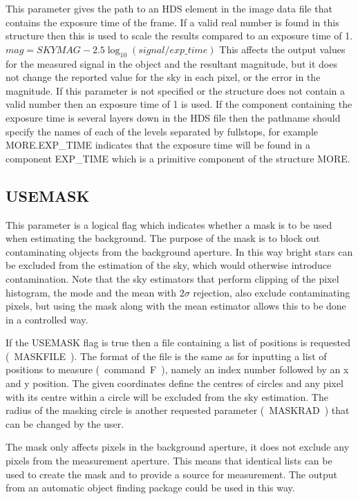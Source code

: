 This parameter gives the path to an HDS element in the image data file
that contains the exposure time of the frame. If a valid real number is
found in this structure then this is used to scale the results compared
to an exposure time of 1.
$mag = SKYMAG - 2.5 \log_{10} ( signal / exp\_time )$
This affects the output values for the measured signal in the object and
the resultant magnitude, but it does not change the reported value for
the sky in each pixel, or the error in the magnitude.
If this parameter is not specified or the structure does not contain a
valid number then an exposure time of 1 is used.
If the component containing the exposure time is several layers down in
the HDS file then the pathname should specify the names of each of the
levels separated by fullstops, for example MORE.EXP\_TIME indicates that
the exposure time will be found in a component EXP\_TIME which is a
primitive component of the structure MORE.

\subsection{USEMASK}

This parameter is a logical flag which indicates whether a mask is to be
used when estimating the background. The purpose of the mask is to block
out contaminating objects from the background aperture. In this way bright
stars can be excluded from the estimation of the sky, which would
otherwise introduce contamination. Note that the sky estimators that
perform clipping of the pixel histogram, the mode and the mean with
$2\sigma$ rejection, also exclude contaminating pixels, but using the mask
along with the mean estimator allows this to be done in a controlled way.

If the USEMASK flag is true then a file containing a list of positions is
requested (~MASKFILE~). The format of the file is the same as for inputting
a list of positions to measure (~command~F~), namely an index number
followed by an x and y position. The given coordinates define the
centres of circles and any pixel with its centre within a circle will be
excluded from the sky estimation. The radius of the masking circle is
another requested parameter (~MASKRAD~) that can be changed by the user.

The mask only affects pixels in the background aperture, it does not
exclude any pixels from the measurement aperture. This means that
identical lists can be used to create the mask and to provide a source
for measurement. The output from an automatic object finding package
could be used in this way.

